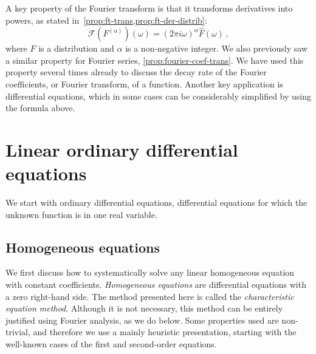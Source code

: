 A key property of the Fourier transform is that it transforms derivatives into powers, as
stated in~\cref{prop:ft-trans,prop:ft-der-distrib}:
\begin{equation}
  \mathcal{F}(F^{(\alpha)})(\omega)=(2\pi i\omega)^{\alpha}\hat{F}(\omega)\,,
\end{equation}
where $F$ is a distribution and $\alpha$ is a non-negative integer. We also previously saw
a similar property for Fourier series, \cf\cref{prop:fourier-coef-trans}. We have used this
property several times already to discuss the decay rate of the Fourier coefficients, or
Fourier transform, of a function. Another key application is differential equations, which
in some cases can be considerably simplified by using the formula above.

\section{Linear ordinary differential equations}
We start with ordinary differential equations, \ie differential equations for which the
unknown function is in one real variable.
\subsection{Homogeneous equations}
We first discuss how to systematically solve any linear homogeneous equation with constant
coefficients. \emph{Homogeneous equations} are differential equations with a zero
right-hand side. The method presented here is called the \emph{characteristic equation
method}. Although it is not necessary, this method can be entirely justified using Fourier
analysis, as we do below. Some properties used are non-trivial, and therefore we use a
mainly heuristic presentation, starting with the well-known cases of the first and
second-order equations.
